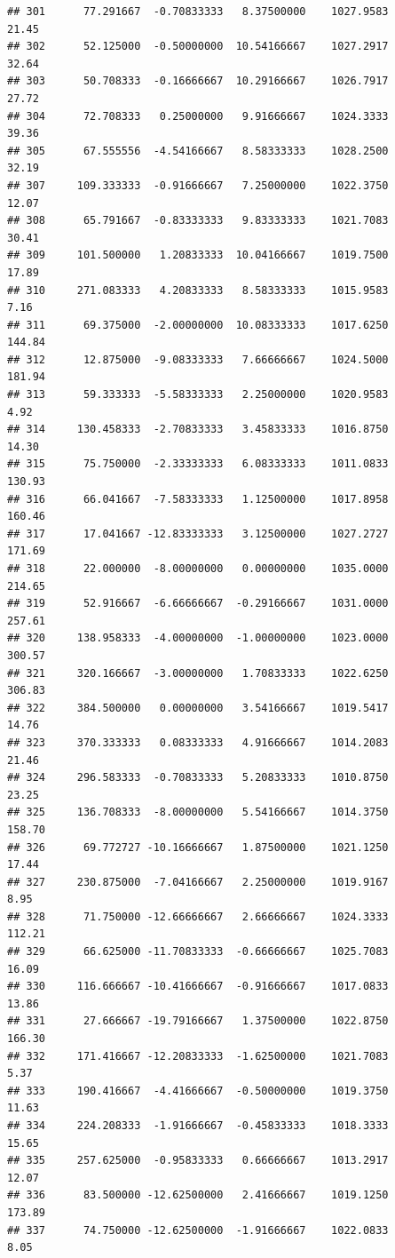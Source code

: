 \documentclass[
]{article}
\begin{document}
\begin{verbatim}
## 301      77.291667  -0.70833333   8.37500000    1027.9583       21.45
## 302      52.125000  -0.50000000  10.54166667    1027.2917       32.64
## 303      50.708333  -0.16666667  10.29166667    1026.7917       27.72
## 304      72.708333   0.25000000   9.91666667    1024.3333       39.36
## 305      67.555556  -4.54166667   8.58333333    1028.2500       32.19
## 307     109.333333  -0.91666667   7.25000000    1022.3750       12.07
## 308      65.791667  -0.83333333   9.83333333    1021.7083       30.41
## 309     101.500000   1.20833333  10.04166667    1019.7500       17.89
## 310     271.083333   4.20833333   8.58333333    1015.9583        7.16
## 311      69.375000  -2.00000000  10.08333333    1017.6250      144.84
## 312      12.875000  -9.08333333   7.66666667    1024.5000      181.94
## 313      59.333333  -5.58333333   2.25000000    1020.9583        4.92
## 314     130.458333  -2.70833333   3.45833333    1016.8750       14.30
## 315      75.750000  -2.33333333   6.08333333    1011.0833      130.93
## 316      66.041667  -7.58333333   1.12500000    1017.8958      160.46
## 317      17.041667 -12.83333333   3.12500000    1027.2727      171.69
## 318      22.000000  -8.00000000   0.00000000    1035.0000      214.65
## 319      52.916667  -6.66666667  -0.29166667    1031.0000      257.61
## 320     138.958333  -4.00000000  -1.00000000    1023.0000      300.57
## 321     320.166667  -3.00000000   1.70833333    1022.6250      306.83
## 322     384.500000   0.00000000   3.54166667    1019.5417       14.76
## 323     370.333333   0.08333333   4.91666667    1014.2083       21.46
## 324     296.583333  -0.70833333   5.20833333    1010.8750       23.25
## 325     136.708333  -8.00000000   5.54166667    1014.3750      158.70
## 326      69.772727 -10.16666667   1.87500000    1021.1250       17.44
## 327     230.875000  -7.04166667   2.25000000    1019.9167        8.95
## 328      71.750000 -12.66666667   2.66666667    1024.3333      112.21
## 329      66.625000 -11.70833333  -0.66666667    1025.7083       16.09
## 330     116.666667 -10.41666667  -0.91666667    1017.0833       13.86
## 331      27.666667 -19.79166667   1.37500000    1022.8750      166.30
## 332     171.416667 -12.20833333  -1.62500000    1021.7083        5.37
## 333     190.416667  -4.41666667  -0.50000000    1019.3750       11.63
## 334     224.208333  -1.91666667  -0.45833333    1018.3333       15.65
## 335     257.625000  -0.95833333   0.66666667    1013.2917       12.07
## 336      83.500000 -12.62500000   2.41666667    1019.1250      173.89
## 337      74.750000 -12.62500000  -1.91666667    1022.0833        8.05

\end{verbatim}
\end{document}
